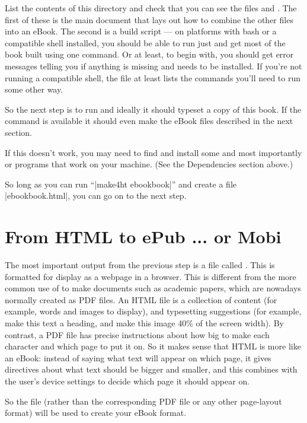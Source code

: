 List the contents of this directory and check that you can see the
files  and . The first of these
is the main \tex document that lays out how to combine the other files
into an eBook.  The second is a build script --- on platforms with
bash or a compatible shell installed, you should be able to run just
 and get most of the book built using one
command. Or at least, to begin with, you should get error messages
telling you if anything is missing and needs to be installed. If you're not
running a compatible shell, the  file at least lists
the commands you'll need to run some other way.

So the next step is to run  and ideally it should
typeset a copy of this book. If the  command is
available it should even make the eBook files described in the next
section.

If this doesn't work, you may need to find and install some
 and most importantly  or
 programs that work on your machine. (See the
Dependencies section above.)

So long as you can run ``\sverb|make4ht ebookbook|'' and create a file \sverb|ebookbook.html|,
you can go on to the next step.

\section{From HTML to ePub ... or Mobi}
\label{sec:html2epub}

The most important output from the previous step is a file called
.  This is formatted for display as a webpage
in a browser. This is different from the more common use of \tex to
make documents such as academic papers, which are nowadays normally
created as PDF files. An HTML file is a collection of content (for
example, words and images to display), and typesetting suggestions
(for example, make this text a heading, and make this image 40\% of
the screen width). By contrast, a PDF file has
precise instructions about how big to make each character and which
page to put it on. So it makes sense that HTML is more like an eBook:
instead of saying what text will appear on which page, it gives
directives about what text should be bigger and smaller, and this
combines with the user's device settings to decide which page it
should appear on.

So the  file (rather than the corresponding
PDF file or any other page-layout format) will be used to
create your eBook format. 

